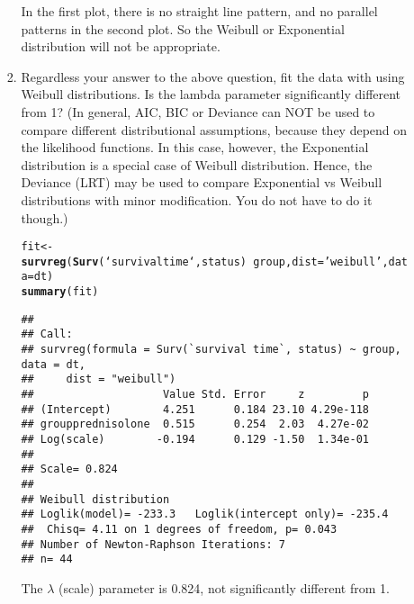 \documentclass[12pt,fleqn]{article}\usepackage[]{graphicx}\usepackage[]{color}
\makeatletter
\newcommand{\hlstr}[1]{\textcolor[rgb]{0.192,0.494,0.8}{#1}}%
\newcommand{\hlopt}[1]{\textcolor[rgb]{0,0,0}{#1}}%
\newcommand{\hlstd}[1]{\textcolor[rgb]{0.345,0.345,0.345}{#1}}%
\newcommand{\hlkwb}[1]{\textcolor[rgb]{0.69,0.353,0.396}{#1}}%
\newcommand{\hlkwc}[1]{\textcolor[rgb]{0.333,0.667,0.333}{#1}}%
\newcommand{\hlkwd}[1]{\textcolor[rgb]{0.737,0.353,0.396}{\textbf{#1}}}%
\newenvironment{kframe}{%
 \def\at@end@of@kframe{}%
 \ifinner\ifhmode%
  \def\at@end@of@kframe{\end{minipage}}%
  \begin{minipage}{\columnwidth}%
 \fi\fi%
 \def\FrameCommand##1{\hskip\@totalleftmargin \hskip-\fboxsep
 \colorbox{shadecolor}{##1}\hskip-\fboxsep
     \hskip-\linewidth \hskip-\@totalleftmargin \hskip\columnwidth}%
 \MakeFramed {\advance\hsize-\width
   \@totalleftmargin\z@ \linewidth\hsize
   \@setminipage}}%
 {\par\unskip\endMakeFramed%
 \at@end@of@kframe}
\newenvironment{knitrout}{}{} %
\theoremstyle{definition}
\makeatother
\begin{document}
\begin{enumerate}[1.]
\begin{enumerate}[(a)]
\begin{enumerate}[(1)]
\begin{knitrout}
\end{knitrout}
	          In the first plot, there is no straight line pattern, and no parallel patterns in the second plot. So the Weibull or Exponential distribution will not be appropriate.
	          \item Regardless your answer to the above question, fit the data with using Weibull distributions. Is the lambda parameter significantly different from 1? (In general, AIC, BIC or Deviance can NOT be used to compare different distributional assumptions, because they depend on the likelihood functions. In this case, however, the Exponential distribution is a special case of Weibull distribution. Hence, the Deviance (LRT) may be used to compare Exponential vs Weibull distributions with minor modification. You do not have to do it though.)
\begin{knitrout}
\color{fgcolor}\begin{kframe}
\begin{alltt}
\hlstd{fit} \hlkwb{<-} \hlkwd{survreg}\hlstd{(}\hlkwd{Surv}\hlstd{(`survival time`, status)} \hlopt{~} \hlstd{group,} \hlkwc{dist}\hlstd{=}\hlstr{'weibull'}\hlstd{,} \hlkwc{data}\hlstd{=dt)}
\hlkwd{summary}\hlstd{(fit)}
\end{alltt}
\begin{verbatim}
## 
## Call:
## survreg(formula = Surv(`survival time`, status) ~ group, data = dt, 
##     dist = "weibull")
##                    Value Std. Error     z         p
## (Intercept)        4.251      0.184 23.10 4.29e-118
## groupprednisolone  0.515      0.254  2.03  4.27e-02
## Log(scale)        -0.194      0.129 -1.50  1.34e-01
## 
## Scale= 0.824 
## 
## Weibull distribution
## Loglik(model)= -233.3   Loglik(intercept only)= -235.4
## 	Chisq= 4.11 on 1 degrees of freedom, p= 0.043 
## Number of Newton-Raphson Iterations: 7 
## n= 44
\end{verbatim}
\end{kframe}
\end{knitrout}
	          The $\lambda$ (scale) parameter is 0.824, not significantly different from 1.
	        \end{enumerate}
	    \end{enumerate}
\end{enumerate}
\end{document}
